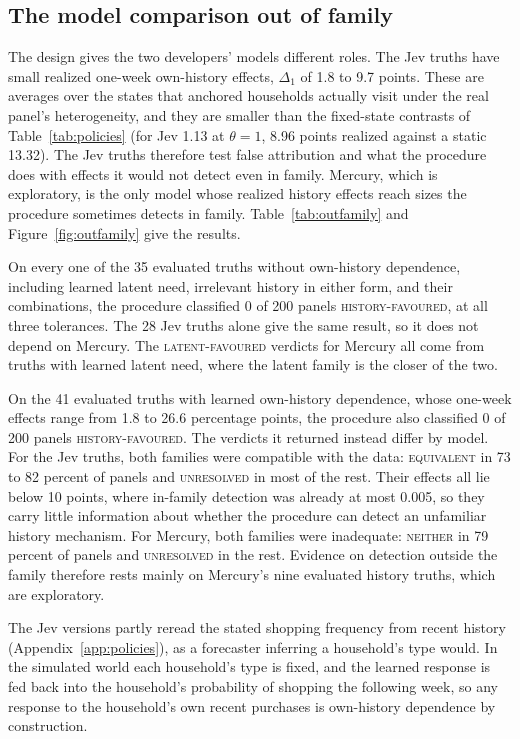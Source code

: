 \documentclass[11pt]{article}
\newcommand{\verdict}[1]{\textsc{#1}}
\begin{document}
\subsection{The model comparison out of family}

The design gives the two developers' models different roles. The Jev truths have small
realized one-week own-history effects, $\Delta_1$ of 1.8 to 9.7 points. These are averages over
the states that anchored households actually visit under the real panel's heterogeneity, and
they are smaller than the fixed-state contrasts of Table~\ref{tab:policies} (for Jev 1.13 at
$\theta=1$, 8.96 points realized against a static 13.32). The Jev truths therefore test false attribution and what
the procedure does with effects it would not detect even in family. Mercury, which is
exploratory, is the only model whose realized history effects reach sizes the procedure sometimes
detects in family. Table~\ref{tab:outfamily} and
Figure~\ref{fig:outfamily} give the results.

On every one of the 35 evaluated truths without own-history dependence, including learned
latent need, irrelevant history in either form, and their combinations, the procedure
classified 0 of 200 panels \verdict{history-favoured}, at all three tolerances. The 28 Jev
truths alone give the same result, so it does not depend on Mercury. The
\verdict{latent-favoured} verdicts for Mercury all come from truths with learned latent need,
where the latent family is the closer of the two.

On the 41 evaluated truths with learned own-history dependence, whose one-week effects range
from 1.8 to 26.6 percentage points, the procedure also classified 0 of 200 panels
\verdict{history-favoured}. The verdicts it returned instead differ by model. For the Jev
truths, both families were compatible with the data: \verdict{equivalent} in 73 to 82 percent
of panels and \verdict{unresolved} in most of the rest. Their effects all lie below 10 points,
where in-family detection was already at most 0.005, so they carry little information about
whether the procedure can detect an unfamiliar history mechanism. For Mercury, both families
were inadequate: \verdict{neither} in 79 percent of panels and \verdict{unresolved} in the
rest. Evidence on detection outside the family therefore rests mainly on Mercury's nine
evaluated history truths, which are exploratory.

The Jev versions partly reread the stated shopping frequency from recent history
(Appendix~\ref{app:policies}), as a forecaster inferring a household's type would. In the
simulated world each household's type is fixed, and the learned response is fed back into the
household's probability of shopping the following week, so any response to the household's
own recent purchases is own-history dependence by construction.
\end{document}

